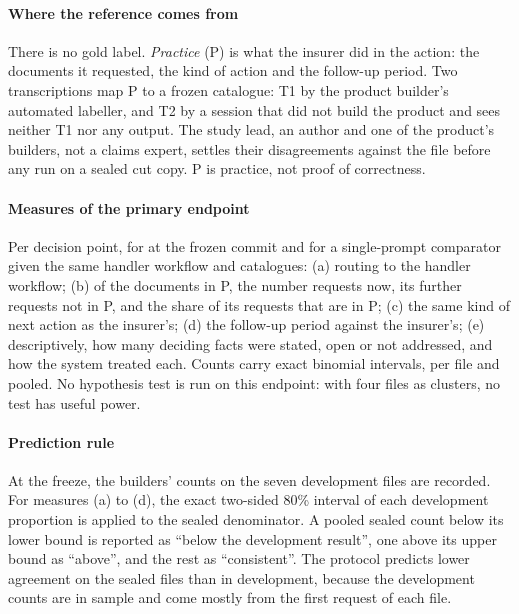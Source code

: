 \paragraph{Where the reference comes from}
There is no gold label. \emph{Practice} (P) is what the insurer did in the action: the documents it requested, the kind of action and the follow-up period. Two transcriptions map P to a frozen catalogue: T1 by the product builder's automated labeller, and T2 by a session that did not build the product and sees neither T1 nor any output. The study lead, an author and one of the product's builders, not a claims expert, settles their disagreements against the file before any run on a sealed cut copy. P is practice, not proof of correctness.

\paragraph{Measures of the primary endpoint}
Per decision point, for \casepath at the frozen commit and for a single-prompt comparator given the same handler workflow and catalogues: (a) routing to the handler workflow; (b) of the documents in P, the number \casepath requests now, its further requests not in P, and the share of its requests that are in P; (c) the same kind of next action as the insurer's; (d) the follow-up period against the insurer's; (e) descriptively, how many deciding facts were stated, open or not addressed, and how the system treated each. Counts carry exact binomial intervals, per file and pooled. No hypothesis test is run on this endpoint: with four files as clusters, no test has useful power.

\paragraph{Prediction rule}
At the freeze, the builders' counts on the seven development files are recorded. For measures (a) to (d), the exact two-sided 80\% interval of each development proportion is applied to the sealed denominator. A pooled sealed count below its lower bound is reported as ``below the development result'', one above its upper bound as ``above'', and the rest as ``consistent''. The protocol predicts lower agreement on the sealed files than in development, because the development counts are in sample and come mostly from the first request of each file.


